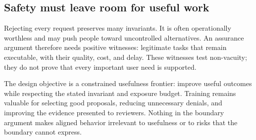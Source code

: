 \subsection{Safety must leave room for useful work}
Rejecting every request preserves many invariants. It is often operationally worthless and may push people toward uncontrolled alternatives. An assurance argument therefore needs positive witnesses: legitimate tasks that remain executable, with their quality, cost, and delay. These witnesses test non-vacuity; they do not prove that every important user need is supported.

The design objective is a constrained usefulness frontier: improve useful outcomes while respecting the stated invariant and exposure budget. Training remains valuable for selecting good proposals, reducing unnecessary denials, and improving the evidence presented to reviewers. Nothing in the boundary argument makes aligned behavior irrelevant to usefulness or to risks that the boundary cannot express.

